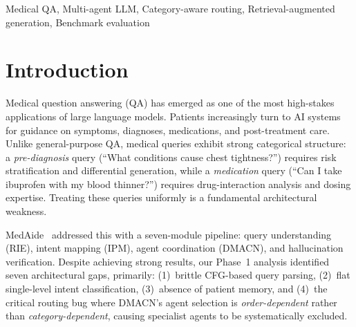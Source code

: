 \documentclass[conference]{IEEEtran}
\begin{document}
\begin{abstract}
We evaluate MedAide+ on a 3,000-instance benchmark (1.5$\times$ the original MedAide dataset) across four models: qwen3:8b, gemma3:4b, phi4-reasoning:14b, and gpt-oss:20b. On qwen3:8b, MedAide+ wins \textbf{all eight} evaluation metrics, achieving $+8.4$\% BLEU-1 overall with Medication category BLEU-1 rising $+20.3$\% ($26.36\!\rightarrow\!31.72$). Our evaluation reveals three coordination regimes: capability-insufficient ($\leq$4B) models regress under default complexity; capability-sufficient ($\sim$8B) models gain strongly from specialist routing; reasoning-saturated/verbose ($\geq$14B) models show near-parity overall but still benefit from Medication routing. Phase~5 reduces gemma3:4b regression from $-0.72$ to $-0.24$ BLEU-1 (67\% improvement) by dynamically suppressing KB injection and capping concurrency for small models. Phase~6 further applies analogous deterministic routing to large models ($\geq$14B), completing the three-tier design. All code, benchmark data, and evaluation scripts are released publicly.
\end{abstract}

\begin{IEEEkeywords}
Medical QA, Multi-agent LLM, Category-aware routing, Retrieval-augmented generation, Benchmark evaluation
\end{IEEEkeywords}

\section{Introduction}
\label{sec:intro}

Medical question answering (QA) has emerged as one of the most high-stakes applications of large language models. Patients increasingly turn to AI systems for guidance on symptoms, diagnoses, medications, and post-treatment care. Unlike general-purpose QA, medical queries exhibit strong categorical structure: a \textit{pre-diagnosis} query (``What conditions cause chest tightness?'') requires risk stratification and differential generation, while a \textit{medication} query (``Can I take ibuprofen with my blood thinner?'') requires drug-interaction analysis and dosing expertise. Treating these queries uniformly is a fundamental architectural weakness.

MedAide~\cite{yang2025medaide} addressed this with a seven-module pipeline: query understanding (RIE), intent mapping (IPM), agent coordination (DMACN), and hallucination verification. Despite achieving strong results, our Phase~1 analysis identified seven architectural gaps, primarily: (1)~brittle CFG-based query parsing, (2)~flat single-level intent classification, (3)~absence of patient memory, and (4)~the critical routing bug where DMACN's agent selection is \textit{order-dependent} rather than \textit{category-dependent}, causing specialist agents to be systematically excluded.
\end{document}
